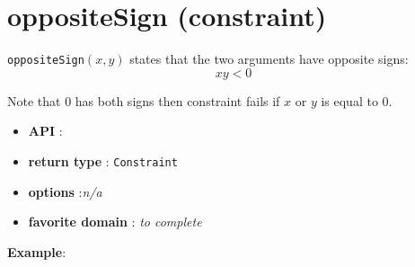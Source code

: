 \label{oppositesign}
\hypertarget{oppositesign}{}

\section{oppositeSign (constraint)}\label{oppositesign:oppositesignconstraint}\hypertarget{oppositesign:oppositesignconstraint}{}


\begin{notedef}
  \texttt{oppositeSign}$(x,y)$ states that the two arguments have opposite signs:
$$xy<0$$
\end{notedef}
Note that $0$ has both signs then constraint fails if $x$ or $y$ is equal to 0.

\begin{itemize}
	\item \textbf{API} : 
	\item \textbf{return type} : \texttt{Constraint}
	\item \textbf{options} :\emph{n/a}
	\item \textbf{favorite domain} : \emph{to complete}
\end{itemize}

\textbf{Example}:
 
